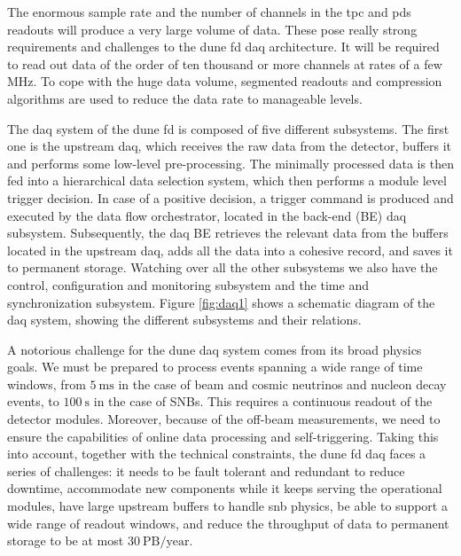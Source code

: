 The enormous sample rate and the number of channels in the \gls{tpc} and \gls{pds} readouts will produce a very large volume of data. These pose really strong requirements and challenges to the \gls{dune} \gls{fd} \gls{daq} architecture. It will be required to read out data of the order of ten thousand or more channels at rates of a few MHz. To cope with the huge data volume, segmented readouts and compression algorithms are used to reduce the data rate to manageable levels.

The \gls{daq} system of the \gls{dune} \gls{fd} is composed of five different subsystems. The first one is the upstream \gls{daq}, which receives the raw data from the detector, buffers it and performs some low-level pre-processing. The minimally processed data is then fed into a hierarchical data selection system, which then performs a module level trigger decision. In case of a positive decision, a trigger command is produced and executed by the data flow orchestrator, located in the back-end (BE) \gls{daq} subsystem. Subsequently, the \gls{daq} BE retrieves the relevant data from the buffers located in the upstream \gls{daq}, adds all the data into a cohesive record, and saves it to permanent storage. Watching over all the other subsystems we also have the control, configuration and monitoring subsystem and the time and synchronization subsystem. Figure \ref{fig:daq1} shows a schematic diagram of the \gls{daq} system, showing the different subsystems and their relations.

A notorious challenge for the \gls{dune} \gls{daq} system comes from its broad physics goals. We must be prepared to process events spanning a wide range of time windows, from $5 \ \mathrm{ms}$ in the case of beam and cosmic neutrinos and nucleon decay events, to $100 \ \mathrm{s}$ in the case of SNBs. This requires a continuous readout of the detector modules. Moreover, because of the off-beam measurements, we need to ensure the capabilities of online data processing and self-triggering. Taking this into account, together with the technical constraints, the \gls{dune} \gls{fd} \gls{daq} faces a series of challenges: it needs to be fault tolerant and redundant to reduce downtime, accommodate new components while it keeps serving the operational modules, have large upstream buffers to handle \gls{snb} physics, be able to support a wide range of readout windows, and reduce the throughput of data to permanent storage to be at most $30 \ \mathrm{PB/year}$.
